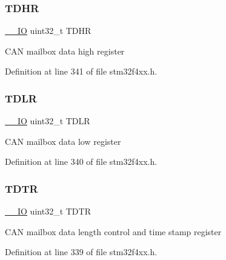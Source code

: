 \subsubsection{\texorpdfstring{T\+D\+HR}{TDHR}}
{\footnotesize\ttfamily \hyperlink{group___c_m_s_i_s__core__definitions_gaec43007d9998a0a0e01faede4133d6be}{\+\_\+\+\_\+\+IO} uint32\+\_\+t T\+D\+HR}

C\+AN mailbox data high register 

Definition at line 341 of file stm32f4xx.\+h.

\mbox{\label{struct_c_a_n___tx_mail_box___type_def_aded1359e1a32512910bff534d57ade68}} 
\subsubsection{\texorpdfstring{T\+D\+LR}{TDLR}}
{\footnotesize\ttfamily \hyperlink{group___c_m_s_i_s__core__definitions_gaec43007d9998a0a0e01faede4133d6be}{\+\_\+\+\_\+\+IO} uint32\+\_\+t T\+D\+LR}

C\+AN mailbox data low register 

Definition at line 340 of file stm32f4xx.\+h.

\mbox{\label{struct_c_a_n___tx_mail_box___type_def_aed87bed042dd9523ce086119a3bab0ea}} 
\subsubsection{\texorpdfstring{T\+D\+TR}{TDTR}}
{\footnotesize\ttfamily \hyperlink{group___c_m_s_i_s__core__definitions_gaec43007d9998a0a0e01faede4133d6be}{\+\_\+\+\_\+\+IO} uint32\+\_\+t T\+D\+TR}

C\+AN mailbox data length control and time stamp register 

Definition at line 339 of file stm32f4xx.\+h.

\mbox{\label{struct_c_a_n___tx_mail_box___type_def_a6921aa1c578a7d17c6e0eb33a73b6630}} 
